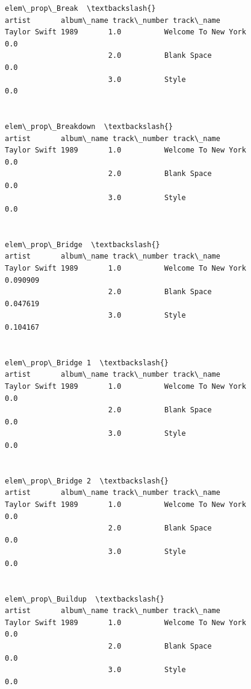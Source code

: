 \documentclass[11pt]{article}
\begin{document}
    
    \begin{Verbatim}[commandchars=\\\{\}]
                                                          elem\_prop\_Break  \textbackslash{}
artist       album\_name track\_number track\_name                             
Taylor Swift 1989       1.0          Welcome To New York              0.0   
                        2.0          Blank Space                      0.0   
                        3.0          Style                            0.0   

                                                          elem\_prop\_Breakdown  \textbackslash{}
artist       album\_name track\_number track\_name                                 
Taylor Swift 1989       1.0          Welcome To New York                  0.0   
                        2.0          Blank Space                          0.0   
                        3.0          Style                                0.0   

                                                          elem\_prop\_Bridge  \textbackslash{}
artist       album\_name track\_number track\_name                              
Taylor Swift 1989       1.0          Welcome To New York          0.090909   
                        2.0          Blank Space                  0.047619   
                        3.0          Style                        0.104167   

                                                          elem\_prop\_Bridge 1  \textbackslash{}
artist       album\_name track\_number track\_name                                
Taylor Swift 1989       1.0          Welcome To New York                 0.0   
                        2.0          Blank Space                         0.0   
                        3.0          Style                               0.0   

                                                          elem\_prop\_Bridge 2  \textbackslash{}
artist       album\_name track\_number track\_name                                
Taylor Swift 1989       1.0          Welcome To New York                 0.0   
                        2.0          Blank Space                         0.0   
                        3.0          Style                               0.0   

                                                          elem\_prop\_Buildup  \textbackslash{}
artist       album\_name track\_number track\_name                               
Taylor Swift 1989       1.0          Welcome To New York                0.0   
                        2.0          Blank Space                        0.0   
                        3.0          Style                              0.0   


\end{Verbatim}
\end{document}
